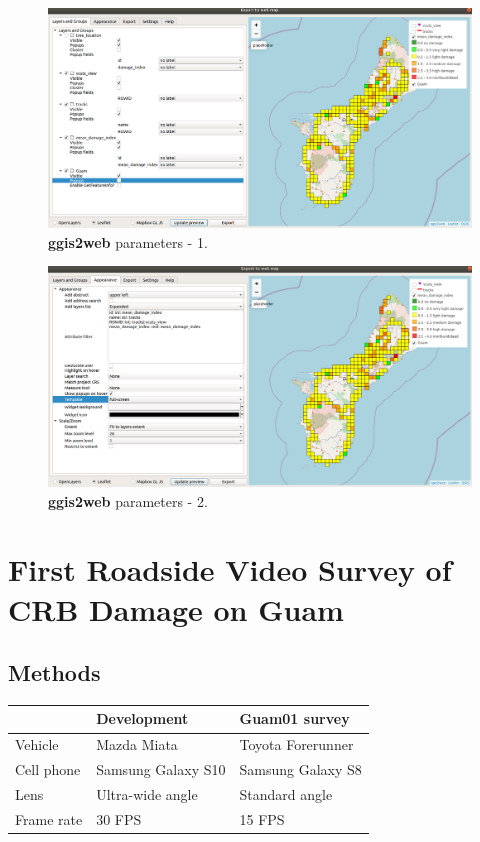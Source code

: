 \documentclass[12pt,letterpaper,english,bibliography=totocnumbered, abstract=on]{scrartcl}
\begin{document}


\begin{figure}[H]
	\centering
	\includegraphics[width=\linewidth]{images/qgis2web1.png}
	\caption{\textbf{ggis2web} parameters - 1.}
	\label{fig:qgis2web1}
\end{figure}

\begin{figure}[H]
	\centering
	\includegraphics[width=\linewidth]{images/qgis2web2.png}
	\caption{\textbf{ggis2web} parameters - 2.}
	\label{fig:qgis2web2}
\end{figure}


\section{First Roadside Video Survey of CRB Damage on Guam}

\subsection{Methods}

\begin{tabular}{|l|l|l|}
	\hline 
	& \textbf{Development} & \textbf{Guam01 survey} \\ 
	\hline 
	Vehicle & Mazda Miata & Toyota Forerunner \\ 
	\hline 
	Cell phone & Samsung Galaxy S10 & Samsung Galaxy S8 \\ 
    \hline 
	Lens & Ultra-wide angle & Standard angle \\
	\hline
	Frame rate & 30 FPS & 15 FPS \\
\hline
\end{tabular} 
\end{document}
